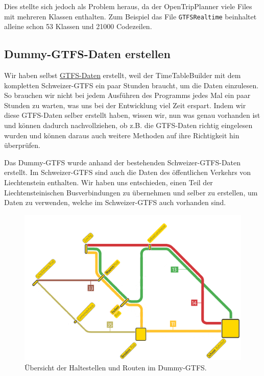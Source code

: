 Dies stellte sich jedoch als Problem heraus, da der OpenTripPlanner viele Files mit mehreren Klassen enthalten. Zum Beispiel das File \texttt{GTFSRealtime} beinhaltet alleine schon 53 Klassen und 21000 Codezeilen.

\subsection{Dummy-GTFS-Daten erstellen}
Wir haben selbst \hyperlink{GTFS}{GTFS-Daten} erstellt, weil der TimeTableBuilder mit dem kompletten Schweizer-GTFS ein paar Stunden braucht, um die Daten einzulesen. So brauchen wir nicht bei jedem Ausführen des Programms jedes Mal ein paar Stunden zu warten, was uns bei der Entwicklung viel Zeit erspart. Indem wir diese GTFS-Daten selber erstellt haben, wissen wir, nun was genau vorhanden ist und können dadurch nachvollziehen, ob z.B. die GTFS-Daten richtig eingelesen wurden und können daraus auch weitere Methoden auf ihre Richtigkeit hin überprüfen.\newline

Das Dummy-GTFS wurde anhand der bestehenden Schweizer-GTFS-Daten erstellt. Im Schweizer-GTFS sind auch die Daten des öffentlichen Verkehrs von Liechtenstein enthalten. Wir haben uns entschieden, einen Teil der Liechtensteinischen Busverbindungen zu übernehmen und selber zu erstellen, um Daten zu verwenden, welche im Schweizer-GTFS auch vorhanden sind.

\begin{figure}[h]
	\centering
	\includegraphics[width=12cm]{img/LiniennetzDummyGTFS.png}
	\caption{Übersicht der Haltestellen und Routen im Dummy-GTFS.}
	\label{fig:DummyGTFS-uebersicht}
\end{figure}





